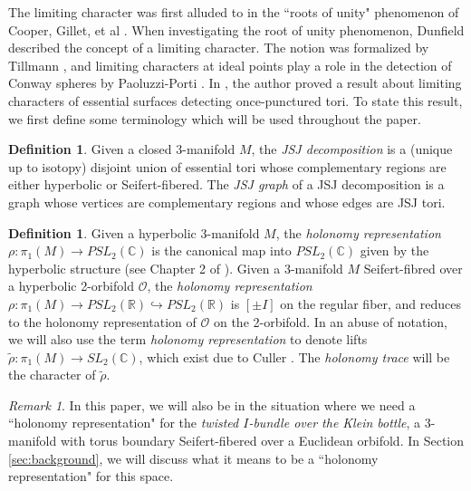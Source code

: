 \documentclass{article}
\theoremstyle{plain}
\theoremstyle{definition}
\newtheorem{definition}[theorem]{Definition}
\theoremstyle{plain}
\theoremstyle{plain}
\theoremstyle{plain}
\theoremstyle{remark}
\newtheorem{remark}[theorem]{Remark}
\theoremstyle{remark}
\theoremstyle{plain}
\theoremstyle{plain}
\begin{document}
The limiting character was first alluded to in the ``roots of unity" phenomenon of Cooper, Gillet, et al \cite{Cooper1994PlaneCA}. When investigating the root of unity phenomenon, Dunfield \cite{Dunfield2008AP1} described the concept of a limiting character. The notion was formalized by Tillmann \cite{tillmann}, and limiting characters at ideal points play a role in the detection of Conway spheres by Paoluzzi-Porti \cite{Paoluzzi2010ConwaySA}. In \cite{Wang}, the author proved a result about limiting characters of essential surfaces detecting once-punctured tori. To state this result, we first define some terminology which will be used throughout the paper. 

\begin{definition}
Given a closed 3-manifold $M$, the \emph{JSJ decomposition} is a (unique up to isotopy) disjoint union of essential tori whose complementary regions are either hyperbolic or Seifert-fibered. The \emph{JSJ graph} of a JSJ decomposition is a graph whose vertices are complementary regions and whose edges are JSJ tori. 
\end{definition}

\begin{definition}
Given a hyperbolic 3-manifold $M$, the \emph{holonomy representation} $\rho: \pi_1(M) \to PSL_2(\mathbb{C})$ is the canonical map into $PSL_2(\mathbb{C})$ given by the hyperbolic structure (see Chapter 2 of \cite{Thurston1979TheGA}). Given a 3-manifold $M$ Seifert-fibred over a hyperbolic 2-orbifold $\mathcal{O}$, the \emph{holonomy representation} $\rho: \pi_1(M) \to PSL_2(\mathbb{R}) \hookrightarrow PSL_2(\mathbb{R})$ is $[\pm I]$ on the regular fiber, and reduces to the holonomy representation of $\mathcal{O}$ on the 2-orbifold. In an abuse of notation, we will also use the term \emph{holonomy representation} to denote lifts $\tilde{\rho}: \pi_1(M) \to SL_2(\mathbb{C})$, which exist due to Culler \cite{Culler1986LiftingRT}. The \emph{holonomy trace} will be the character of $\tilde{\rho}$. 
\end{definition}

\begin{remark}
In this paper, we will also be in the situation where we need a ``holonomy representation" for the \emph{twisted $I$-bundle over the Klein bottle}, a 3-manifold with torus boundary Seifert-fibered over a Euclidean orbifold. In Section \ref{sec:background}, we will discuss what it means to be a ``holonomy representation" for this space.
\end{remark}
\end{document}
